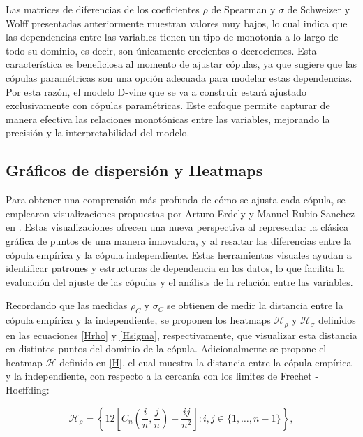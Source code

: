 Las matrices de diferencias de los coeficientes $\rho$ de Spearman y $\sigma$ de Schweizer y Wolff presentadas anteriormente muestran valores muy bajos, lo cual indica que las dependencias entre las variables tienen un tipo de monotonía a lo largo de todo su dominio, es decir, son únicamente crecientes o decrecientes. Esta característica es beneficiosa al momento de ajustar cópulas, ya que sugiere que las cópulas paramétricas son una opción adecuada para modelar estas dependencias. Por esta razón, el modelo D-vine que se va a construir estará ajustado exclusivamente con cópulas paramétricas. Este enfoque permite capturar de manera efectiva las relaciones monotónicas entre las variables, mejorando la precisión y la interpretabilidad del modelo.




\subsection{Gráficos de dispersión y Heatmaps}

Para obtener una comprensión más profunda de cómo se ajusta cada cópula, se emplearon visualizaciones propuestas por Arturo Erdely y Manuel Rubio-Sanchez en \cite{Erdely2022}. Estas visualizaciones ofrecen una nueva perspectiva al representar la clásica gráfica de puntos de una manera innovadora, y al resaltar las diferencias entre la cópula empírica y la cópula independiente. Estas herramientas visuales ayudan a identificar patrones y estructuras de dependencia en los datos, lo que facilita la evaluación del ajuste de las cópulas y el análisis de la relación entre las variables. 

Recordando que las medidas $\rho_C$ y $\sigma_C$ se obtienen de medir la distancia entre la cópula empírica y la independiente, se proponen los heatmaps $\mathscr{H}_\rho$ y $\mathscr{H}_\sigma$ definidos en las ecuaciones \eqref{Hrho} y \eqref{Hsigma}, respectivamente, que visualizar esta distancia en distintos puntos del dominio de la cópula. Adicionalmente se propone el heatmap $\mathscr{H}$ definido en \eqref{H}, el cual muestra la distancia entre la cópula empírica y la independiente, con respecto a la cercanía con los limites de Frechet -Hoeffding:

\begin{equation}\label{Hrho}
    \mathscr{H}_\rho=\left\{12\left[C_n\left(\frac{i}{n}, \frac{j}{n}\right)-\frac{i j}{n^2}\right]: i, j \in\{1, \ldots, n-1\}\right\},
\end{equation}

